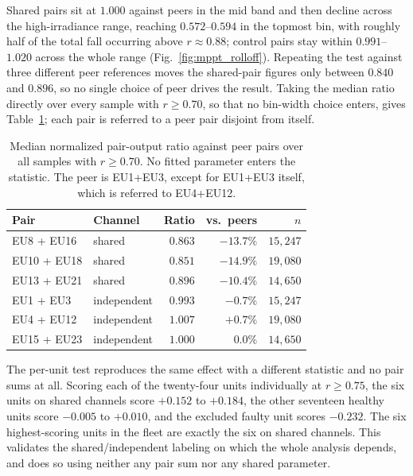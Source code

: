 Shared pairs sit at $1.000$ against peers in the mid band and then decline across the high-irradiance range, reaching $0.572$--$0.594$ in the topmost bin, with roughly half of the total fall occurring above $r \approx 0.88$; control pairs stay within $0.991$--$1.020$ across the whole range (Fig.~\ref{fig:mppt_rolloff}). Repeating the test against three different peer references moves the shared-pair figures only between $0.840$ and $0.896$, so no single choice of peer drives the result. Taking the median ratio directly over every sample with $r \ge 0.70$, so that no bin-width choice enters, gives Table~\ref{tab:mppt_peer}; each pair is referred to a peer pair disjoint from itself.

\begin{table}[!t]
  \renewcommand{\arraystretch}{1.3}
  \centering
  \caption{Median normalized pair-output ratio against peer pairs over all
samples with $r \ge 0.70$. No fitted parameter enters the statistic. The peer is EU1+EU3, except for EU1+EU3 itself, which is referred to EU4+EU12.}
  \label{tab:mppt_peer}
  \footnotesize
  \setlength{\tabcolsep}{4pt}
  \begin{tabular}{@{}llrrr@{}}
    \toprule
    Pair & Channel & Ratio & vs.\ peers & $n$ \\
    \midrule
    EU8 + EU16   & shared      & $0.863$ & $-13.7\%$ & $15{,}247$ \\
    EU10 + EU18  & shared      & $0.851$ & $-14.9\%$ & $19{,}080$ \\
    EU13 + EU21  & shared      & $0.896$ & $-10.4\%$ & $14{,}650$ \\
    \addlinespace
    EU1 + EU3    & independent & $0.993$ & $-0.7\%$  & $15{,}247$ \\
    EU4 + EU12   & independent & $1.007$ & $+0.7\%$  & $19{,}080$ \\
    EU15 + EU23  & independent & $1.000$ & $0.0\%$   & $14{,}650$ \\
    \bottomrule
  \end{tabular}
\end{table}

The per-unit test reproduces the same effect with a different statistic and no pair sums at all. Scoring each of the twenty-four units individually at $r \ge 0.75$, the six units on shared channels score $+0.152$ to $+0.184$, the other seventeen healthy units score $-0.005$ to $+0.010$, and the excluded faulty unit scores $-0.232$. The six highest-scoring units in the fleet are exactly the six on shared channels. This validates the shared/independent labeling on which the whole analysis depends, and does so using neither any pair sum nor any shared parameter.

